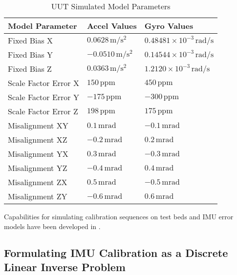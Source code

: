 \begin{table}[h!]
	\centering
	\begin{tabular}{|p{4cm}|p{3.5cm}|p{3.5cm}|}
		\hline
		\textbf{Model Parameter} & \textbf{Accel Values} & \textbf{Gyro Values} \\ \hline
		Fixed Bias X & $0.0628 \,\unit{\meter\per\second\squared}$ & $0.48481 \times 10^{-3} \,\unit{\radian\per\second}$ \\ \hline
		Fixed Bias Y & $-0.0510 \,\unit{\meter\per\second\squared}$ & $0.14544 \times 10^{-3}  \,\unit{\radian\per\second}$ \\ \hline
		Fixed Bias Z & $0.0363 \,\unit{\meter\per\second\squared}$ & $1.2120 \times 10^{-3}  \,\unit{\radian\per\second}$ \\ \hline
		Scale Factor Error X & $150 \,\textrm{ppm}$ & $450 \,\textrm{ppm}$ \\ \hline
		Scale Factor Error Y & $-175 \,\textrm{ppm}$ & $-300 \,\textrm{ppm}$ \\ \hline
		Scale Factor Error Z & $198 \,\textrm{ppm}$ & $175 \,\textrm{ppm}$ \\ \hline
		Misalignment XY & $0.1 \,\unit{\milli\radian}$ & $-0.1 \,\unit{\milli\radian}$ \\ \hline
		Misalignment XZ & $-0.2 \,\unit{\milli\radian}$ & $0.2 \,\unit{\milli\radian}$ \\ \hline
		Misalignment YX & $0.3 \,\unit{\milli\radian}$ & $-0.3 \,\unit{\milli\radian}$ \\ \hline
		Misalignment YZ & $-0.4 \,\unit{\milli\radian}$ & $0.4 \,\unit{\milli\radian}$ \\ \hline
		Misalignment ZX & $0.5 \,\unit{\milli\radian}$ & $-0.5 \,\unit{\milli\radian}$ \\ \hline
		Misalignment ZY & $-0.6 \,\unit{\milli\radian}$ & $0.6 \,\unit{\milli\radian}$ \\ \hline
	\end{tabular}
	\caption{UUT Simulated Model Parameters}
	\label{tab: UUT simulated model parameters}
\end{table}
\FloatBarrier

Capabilities for simulating calibration sequences on test beds and IMU error models have been developed in \MATLAB. 


\subsection{Formulating IMU Calibration as a Discrete Linear Inverse Problem}

